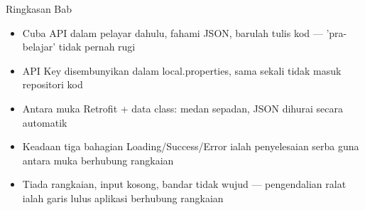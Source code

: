 \begin{tcbsummary}{Ringkasan Bab}
\begin{itemize}
  \item Cuba API dalam pelayar dahulu, fahami JSON, barulah tulis kod — 'pra-belajar' tidak pernah rugi
  \item API Key disembunyikan dalam local.properties, sama sekali tidak masuk repositori kod
  \item Antara muka Retrofit + data class: medan sepadan, JSON dihurai secara automatik
  \item Keadaan tiga bahagian Loading/Success/Error ialah penyelesaian serba guna antara muka berhubung rangkaian
  \item Tiada rangkaian, input kosong, bandar tidak wujud — pengendalian ralat ialah garis lulus aplikasi berhubung rangkaian
\end{itemize}

\end{tcbsummary}
